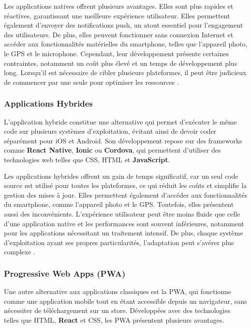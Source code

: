 Les applications natives offrent plusieurs avantages. Elles sont plus rapides et réactives, garantissant une meilleure expérience utilisateur. Elles permettent également d’envoyer des notifications push, un atout essentiel pour l’engagement des utilisateurs. De plus, elles peuvent fonctionner sans connexion Internet et accéder aux fonctionnalités matérielles du smartphone, telles que l’appareil photo, le GPS et le microphone. Cependant, leur développement présente certaines contraintes, notamment un coût plus élevé et un temps de développement plus long. Lorsqu’il est nécessaire de cibler plusieurs plateformes, il peut être judicieux de commencer par une seule pour optimiser les ressources \cite{definition-application-mobile}.  

\subsubsection*{Applications Hybrides}
L’application hybride constitue une alternative qui permet d’exécuter le même code sur plusieurs systèmes d’exploitation, évitant ainsi de devoir coder séparément pour iOS et Android. Son développement repose sur des frameworks comme \textbf{React Native}, \textbf{Ionic} ou \textbf{Cordova}, qui permettent d’utiliser des technologies web telles que \gls{CSS}, \gls{HTML} et \textbf{JavaScript}.  

Les applications hybrides offrent un gain de temps significatif, car un seul code source est utilisé pour toutes les plateformes, ce qui réduit les coûts et simplifie la gestion des mises à jour. Elles permettent également d’accéder aux fonctionnalités du smartphone, comme l’appareil photo et le GPS. Toutefois, elles présentent aussi des inconvénients. L’expérience utilisateur peut être moins fluide que celle d’une application native et les performances sont souvent inférieures, notamment pour les applications nécessitant un traitement intensif. De plus, chaque système d’exploitation ayant ses propres particularités, l’adaptation peut s’avérer plus complexe \cite{definition-application-mobile}.  

\subsubsection*{Progressive Web Apps (\gls{PWA})}
Une autre alternative aux applications classiques est la \gls{PWA}, qui fonctionne comme une application mobile tout en étant accessible depuis un navigateur, sans nécessiter de téléchargement sur un store. Développées avec des technologies telles que \gls{HTML}, \textbf{React} et \gls{CSS}, les PWA présentent plusieurs avantages.  

